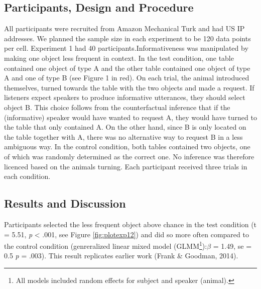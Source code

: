 \documentclass[10pt, letterpaper]{article}
\begin{document}
\subsection{Participants, Design and
Procedure}\label{participants-design-and-procedure}

All participants were recruited from Amazon Mechanical Turk and had US
IP addresses. We planned the sample size in each experiment to be 120
data points per cell. Experiment 1 had 40 participants.Informativeness
was manipulated by making one object less frequent in context. In the
test condition, one table contained one object of type A and the other
table contained one object of type A and one of type B (see Figure 1 in
red). On each trial, the animal introduced themselves, turned towards
the table with the two objects and made a request. If listeners expect
speakers to produce informative utterances, they should select object B.
This choice follows from the counterfactual inference that if the
(informative) speaker would have wanted to request A, they would have
turned to the table that only contained A. On the other hand, since B is
only located on the table together with A, there was no alternative way
to request B in a less ambiguous way. In the control condition, both
tables contained two objects, one of which was randomly determined as
the correct one. No inference was therefore licenced based on the
animals turning. Each participant received three trials in each
condition.

\subsection{Results and Discussion}\label{results-and-discussion}

Participants selected the less frequent object above chance in the test
condition (t = 5.51, \emph{p} \textless{} .001, see Figure
\ref{fig:plotexp12}) and did so more often compared to the control
condition (genreralized linear mixed model
(GLMM\footnote{All models included random effects for subject and speaker (animal).}):\emph{\(\beta\)}
= 1.49, se = 0.5 \emph{p} = .003). This result replicates earlier work
(Frank \& Goodman, 2014).
\end{document}
